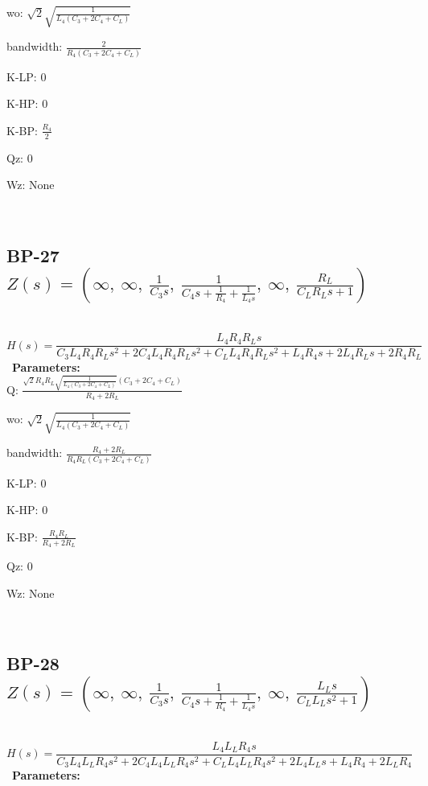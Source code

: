 \documentclass{article}
\begin{document}
wo: $\sqrt{2} \sqrt{\frac{1}{L_{4} \left(C_{3} + 2 C_{4} + C_{L}\right)}}$\ 

bandwidth: $\frac{2}{R_{4} \left(C_{3} + 2 C_{4} + C_{L}\right)}$\ 

K-LP: $0$\ 

K-HP: $0$\ 

K-BP: $\frac{R_{4}}{2}$\ 

Qz: $0$\ 

Wz: $\text{None}$\ 

\ 

\subsection{BP-27 $Z(s) = \left( \infty, \  \infty, \  \frac{1}{C_{3} s}, \  \frac{1}{C_{4} s + \frac{1}{R_{4}} + \frac{1}{L_{4} s}}, \  \infty, \  \frac{R_{L}}{C_{L} R_{L} s + 1}\right)$ } \ 
\textbf{\[H(s) = \frac{L_{4} R_{4} R_{L} s}{C_{3} L_{4} R_{4} R_{L} s^{2} + 2 C_{4} L_{4} R_{4} R_{L} s^{2} + C_{L} L_{4} R_{4} R_{L} s^{2} + L_{4} R_{4} s + 2 L_{4} R_{L} s + 2 R_{4} R_{L}}\] } \ 
\textbf{Parameters:}\\ 

Q: $\frac{\sqrt{2} R_{4} R_{L} \sqrt{\frac{1}{L_{4} \left(C_{3} + 2 C_{4} + C_{L}\right)}} \left(C_{3} + 2 C_{4} + C_{L}\right)}{R_{4} + 2 R_{L}}$\ 

wo: $\sqrt{2} \sqrt{\frac{1}{L_{4} \left(C_{3} + 2 C_{4} + C_{L}\right)}}$\ 

bandwidth: $\frac{R_{4} + 2 R_{L}}{R_{4} R_{L} \left(C_{3} + 2 C_{4} + C_{L}\right)}$\ 

K-LP: $0$\ 

K-HP: $0$\ 

K-BP: $\frac{R_{4} R_{L}}{R_{4} + 2 R_{L}}$\ 

Qz: $0$\ 

Wz: $\text{None}$\ 

\ 

\subsection{BP-28 $Z(s) = \left( \infty, \  \infty, \  \frac{1}{C_{3} s}, \  \frac{1}{C_{4} s + \frac{1}{R_{4}} + \frac{1}{L_{4} s}}, \  \infty, \  \frac{L_{L} s}{C_{L} L_{L} s^{2} + 1}\right)$ } \ 
\textbf{\[H(s) = \frac{L_{4} L_{L} R_{4} s}{C_{3} L_{4} L_{L} R_{4} s^{2} + 2 C_{4} L_{4} L_{L} R_{4} s^{2} + C_{L} L_{4} L_{L} R_{4} s^{2} + 2 L_{4} L_{L} s + L_{4} R_{4} + 2 L_{L} R_{4}}\] } \ 
\textbf{Parameters:}\\ 
\end{document}

